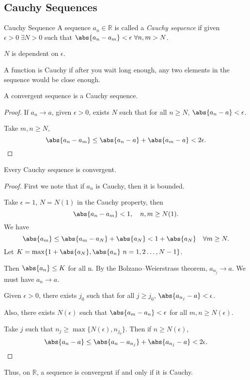 \subsection{Cauchy Sequences}
\leavevmode
\begin{definition}{Cauchy Sequence}{}
    A sequence \(a_n \in \mathbb{R}\) is called a \textit{Cauchy sequence} if given \(\epsilon > 0~\exists N > 0\) such that \(\abs{a_n - a_m} <\epsilon ~\forall n,m > N\).
\end{definition}
\begin{note}
    \(N\) is dependent on \(\epsilon\).
\end{note}
A function is Cauchy if after you wait long enough, any two elements in the sequence would be close enough.
\begin{lemma}{}{}
    A convergent sequence is a Cauchy sequence.
\end{lemma}
\begin{proof}
    If \(a_n \to a\), given \(\epsilon > 0\), exists \(N\) such that for all \(n \geq  N\), \(\abs{a_n - a} < \epsilon\).

    Take \(m, n \geq N\),
    \[
        \abs{a_n - a_m} \leq \abs{a_n - a} + \abs{a_m - a} < 2\epsilon.
    \]
\end{proof}
\begin{lemma}{}{}
    Every Cauchy sequence is convergent.
\end{lemma}
\begin{proof}
    First we note that if \(a_n\) is Cauchy, then it is bounded.

    Take \(\epsilon = 1\), \(N = N(1)\) in the Cauchy property, then
    \[
        \abs{a_n - a_m} < 1, \quad n, m \geq N(1).
    \]
    We have
    \[
        \abs{a_m} \leq \abs{a_m - a_N} + \abs{a_N} < 1 + \abs{a_N} \quad \forall m \geq N.
    \]
    Let \(K = \mathop{\max}\{1 + \abs{a_N}, \abs{a_n}~n=1,2 \ldots ,N-1\}\).

    Then \(\abs{a_n} \leq K\) for all n. By the Bolzano–Weierstrass theorem, \(a_{n_j} \to a\). We must have \(a_n \to a\).

    Given \(\epsilon>0\), there exists \(j_0\) such that for all \(j \geq j_0\), \(\abs{a_{n_j}-a} < \epsilon\).

    Also, there exists \(N(\epsilon)\) such that \(\abs{a_m - a_n} < \epsilon\) for all \(m, n \geq N(\epsilon)\).

    Take \(j\) such that \(n_j\geq \max \{N(\epsilon),n_{j_0}\}\). Then if \(n \geq N(\epsilon)\),
    \[
        \abs{a_n - a} \leq \abs{a_n - a_{n_j}} + \abs{a_{n_j} - a} < 2\epsilon.
    \]
\end{proof}
Thus, on \(\mathbb{R}\), a sequence is convergent if and only if it is Cauchy.


